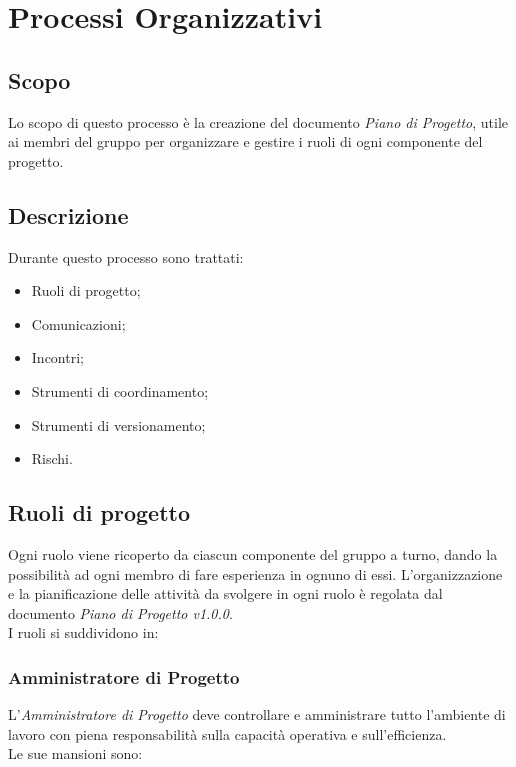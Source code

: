 \documentclass[./../NomeDocumento.tex]{subfiles}
\begin{document}
	
	\chapter{Processi Organizzativi}
	
	\section{Scopo}
	Lo scopo di questo processo è la creazione del documento \textit{Piano di Progetto}, utile ai membri del gruppo per organizzare e gestire i ruoli di ogni componente del progetto.
	
	\section {Descrizione}
	Durante questo processo sono trattati:
	\begin{itemize}
		\item Ruoli di progetto;
		\item Comunicazioni;
		\item Incontri;
		\item Strumenti di coordinamento;
		\item Strumenti di versionamento;
		\item Rischi.
		
	\end{itemize}
	
	\section {Ruoli di progetto}
	
	Ogni ruolo viene ricoperto da ciascun componente del gruppo a turno, dando la possibilità ad ogni membro di fare esperienza in ognuno di essi. L'organizzazione e la pianificazione delle attività da svolgere in ogni ruolo è regolata dal documento \textit{Piano di Progetto v1.0.0}.
	\\ \noindent I ruoli si suddividono in:
	
	\subsection {Amministratore di Progetto}
	
	L’\textit{Amministratore di Progetto} deve controllare e amministrare tutto l’ambiente di lavoro con piena responsabilità sulla capacità operativa e sull’efficienza. 
	\\ \noindent Le sue mansioni sono: 
	
\end{document}
